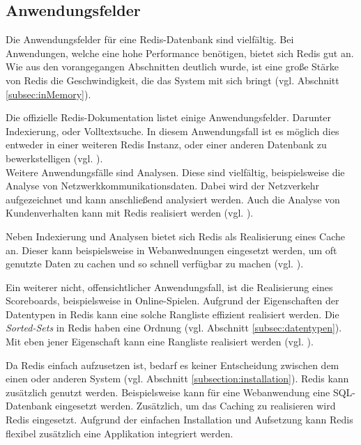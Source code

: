 
\subsection{Anwendungsfelder}
Die Anwendungsfelder für eine \acs{Redis}-Datenbank sind vielfältig. Bei Anwendungen, welche eine hohe Performance benötigen, bietet sich \acs{Redis} gut an. Wie aus den vorangegangen Abschnitten deutlich wurde, ist eine große Stärke von \acs{Redis} die Geschwindigkeit, die das System mit sich bringt (vgl. Abschnitt \ref{subsec:inMemory}).

Die offizielle \acs{Redis}-Dokumentation listet einige Anwendungsfelder. Darunter Indexierung, oder Volltextsuche. In diesem Anwendungsfall ist es möglich dies entweder in einer weiteren \acs{Redis} Instanz, oder einer anderen Datenbank zu bewerkstelligen (vgl. \cite{Redis-Docs-Anwen}).
\\Weitere Anwendungsfälle sind Analysen. Diese sind vielfältig, beispielsweise die Analyse von Netzwerkkommunikationsdaten. Dabei wird der Netzverkehr aufgezeichnet und kann anschließend analysiert werden. Auch die Analyse von Kundenverhalten kann mit \acs{Redis} realisiert werden (vgl. \cite{Redis-Docs-Anwen}).

Neben Indexierung und Analysen bietet sich \acs{Redis} als Realisierung eines Cache an. Dieser kann beispielsweise in Webanwednungen eingesetzt werden, um oft genutzte Daten zu cachen und so schnell verfügbar zu machen (vgl. \cite{Redis-Docs-cache}).

Ein weiterer nicht, offensichtlicher Anwendungsfall, ist die Realisierung eines Scoreboards, beispielsweise in Online-Spielen. Aufgrund der Eigenschaften der Datentypen in \acs{Redis} kann eine solche Rangliste effizient realisiert werden. Die \textit{Sorted-Sets} in \acs{Redis} haben eine Ordnung (vgl. Abschnitt \ref{subsec:datentypen}). Mit eben jener Eigenschaft kann eine Rangliste realisiert werden (vgl. \cite{Redis-Docs-leaderboard}).

Da \acs{Redis} einfach aufzusetzen ist, bedarf es keiner Entscheidung zwischen dem einen oder anderen System (vgl. Abschnitt \ref{subsection:installation}). \acs{Redis} kann zusätzlich genutzt werden. Beispielsweise kann für eine Webanwendung eine SQL-Datenbank eingesetzt werden. Zusätzlich, um das Caching zu realisieren wird \acs{Redis} eingesetzt. Aufgrund der einfachen Installation und Aufsetzung kann \acs{Redis} flexibel zusätzlich eine Applikation integriert werden.

